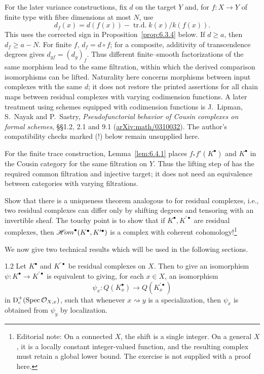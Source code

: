 For the later variance constructions, fix $d$ on the target $Y$ and, for $f\colon X\to Y$ of finite type with fibre dimensions at most $N$, use
\[
d_f(x)=d(f(x))-\operatorname{tr.d.} k(x)/k(f(x)).
\]
This uses the corrected sign in Proposition~\ref{prop:6.3.4} below. If $d\geq a$, then $d_f\geq a-N$. For finite $f$, $d_f=d\circ f$; for a composite, additivity of transcendence degrees gives $d_{gf}=(d_g)_f$. Thus different finite--smooth factorizations of the same morphism lead to the same filtration, within which the derived comparison isomorphisms can be lifted. Naturality here concerns morphisms between input complexes with the same $d$; it does not restore the printed assertions for all chain maps between residual complexes with varying codimension functions. A later treatment using schemes equipped with codimension functions is J.\ Lipman, S.\ Nayak and P.\ Sastry, \emph{Pseudofunctorial behavior of Cousin complexes on formal schemes}, \S\S1.2, 2.1 and 9.1 (\href{https://arxiv.org/abs/math/0310032}{arXiv:math/0310032}). The author's compatibility checks marked (!) below remain unsupplied here.

For the finite trace construction, Lemma~\ref{lem:6.4.1} places $f_*f'(K^\bullet)$ and $K^\bullet$ in the Cousin category for the same filtration on $Y$. Thus the lifting step of  has the required common filtration and injective target; it does not need an equivalence between categories with varying filtrations.

\begin{exercise*}
Show that there is a uniqueness theorem analogous to  for residual complexes, i.e., two residual complexes can differ only by shifting degrees and tensoring with an invertible sheaf. The touchy point is to show that if $K^{\bullet}, K^{\prime\bullet}$ are residual complexes, then $\mathop{\mathscr{H}\!om}\nolimits^{\bullet}(K^{\bullet}, K^{\prime\bullet})$ is a complex with coherent cohomology!\footnote{Editorial note: On a connected $X$, the shift is a single integer. On a general $X$, it is a locally constant integer-valued function, and the resulting complex must retain a global lower bound. The exercise is not supplied with a proof here.}

\end{exercise*}

We now give two technical results which will be used in the following sections.

\begin{booklemma}{1.2}\label{lem:6.1.2}
Let $K^\bullet$ and $K^{\prime\bullet}$ be residual complexes on $X$. Then to give an isomorphism $\psi\colon K^\bullet\to K^{\prime\bullet}$ is equivalent to giving, for each $x\in X$, an isomorphism
\[
\psi_x\colon Q(K_x^\bullet)\longrightarrow Q(K_x^{\prime\bullet})
\]
in $\operatorname{D}_{\mathrm{c}}^+(\operatorname{Spec}\mathcal{O}_{X,x})$, such that whenever $x\rightsquigarrow y$ is a specialization, then $\psi_x$ is obtained from $\psi_y$ by localization.
\end{booklemma}


